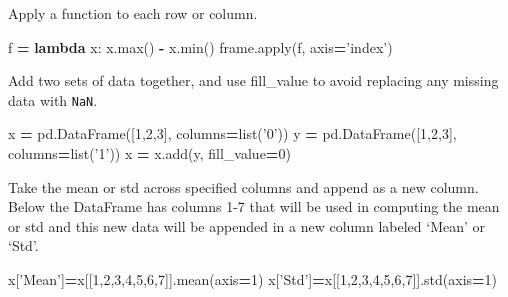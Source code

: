 \documentclass[]{book}
\newenvironment{Shaded}{\begin{snugshade}}{\end{snugshade}}
\newcommand{\BuiltInTok}[1]{#1}
\newcommand{\DecValTok}[1]{\textcolor[rgb]{0.00,0.00,0.81}{#1}}
\newcommand{\KeywordTok}[1]{\textcolor[rgb]{0.13,0.29,0.53}{\textbf{#1}}}
\newcommand{\NormalTok}[1]{#1}
\newcommand{\OperatorTok}[1]{\textcolor[rgb]{0.81,0.36,0.00}{\textbf{#1}}}
\newcommand{\StringTok}[1]{\textcolor[rgb]{0.31,0.60,0.02}{#1}}
\begin{document}
Apply a function to each row or column.

\begin{Shaded}
\begin{Highlighting}[]
\NormalTok{f }\OperatorTok{=} \KeywordTok{lambda}\NormalTok{ x: x.}\BuiltInTok{max}\NormalTok{() }\OperatorTok{-}\NormalTok{ x.}\BuiltInTok{min}\NormalTok{()}
\NormalTok{frame.}\BuiltInTok{apply}\NormalTok{(f, axis}\OperatorTok{=}\StringTok{'index'}\NormalTok{)}
\end{Highlighting}
\end{Shaded}

Add two sets of data together, and use fill\_value to avoid replacing any missing data with \texttt{NaN}.

\begin{Shaded}
\begin{Highlighting}[]
\NormalTok{x }\OperatorTok{=}\NormalTok{ pd.DataFrame([}\DecValTok{1}\NormalTok{,}\DecValTok{2}\NormalTok{,}\DecValTok{3}\NormalTok{], columns}\OperatorTok{=}\BuiltInTok{list}\NormalTok{(}\StringTok{'0'}\NormalTok{))    }
\NormalTok{y }\OperatorTok{=}\NormalTok{ pd.DataFrame([}\DecValTok{1}\NormalTok{,}\DecValTok{2}\NormalTok{,}\DecValTok{3}\NormalTok{], columns}\OperatorTok{=}\BuiltInTok{list}\NormalTok{(}\StringTok{'1'}\NormalTok{))}
\NormalTok{x }\OperatorTok{=}\NormalTok{ x.add(y, fill_value}\OperatorTok{=}\DecValTok{0}\NormalTok{)}
\end{Highlighting}
\end{Shaded}

Take the mean or std across specified columns and append as a new column. Below the DataFrame has columns 1-7 that will be used in computing the mean or std and this new data will be appended in a new column labeled `Mean' or `Std'.

\begin{Shaded}
\begin{Highlighting}[]
\NormalTok{x[}\StringTok{'Mean'}\NormalTok{]}\OperatorTok{=}\NormalTok{x[[}\DecValTok{1}\NormalTok{,}\DecValTok{2}\NormalTok{,}\DecValTok{3}\NormalTok{,}\DecValTok{4}\NormalTok{,}\DecValTok{5}\NormalTok{,}\DecValTok{6}\NormalTok{,}\DecValTok{7}\NormalTok{]].mean(axis}\OperatorTok{=}\DecValTok{1}\NormalTok{)}
\NormalTok{x[}\StringTok{'Std'}\NormalTok{]}\OperatorTok{=}\NormalTok{x[[}\DecValTok{1}\NormalTok{,}\DecValTok{2}\NormalTok{,}\DecValTok{3}\NormalTok{,}\DecValTok{4}\NormalTok{,}\DecValTok{5}\NormalTok{,}\DecValTok{6}\NormalTok{,}\DecValTok{7}\NormalTok{]].std(axis}\OperatorTok{=}\DecValTok{1}\NormalTok{)}
\end{Highlighting}
\end{Shaded}
\end{document}
